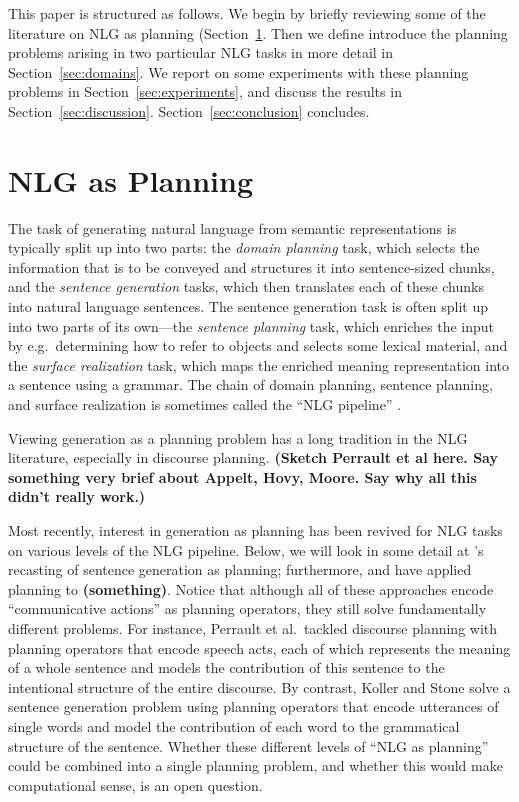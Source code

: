 \documentclass[letterpaper]{article}
\newcommand{\todo}[1]{\textbf{(#1)}}
\begin{document}
This paper is structured as follows. We begin by briefly reviewing
some of the literature on NLG as planning
(Section~\ref{sec:nlg-as-planning}. Then we define introduce the
planning problems arising in two particular NLG tasks in more detail
in Section~\ref{sec:domains}. We report on some experiments with these
planning problems in Section~\ref{sec:experiments}, and discuss the
results in Section~\ref{sec:discussion}. Section~\ref{sec:conclusion}
concludes.


\section{NLG as Planning} \label{sec:nlg-as-planning}

The task of generating natural language from semantic representations
is typically split up into two parts: the \emph{domain planning} task,
which selects the information that is to be conveyed and structures it
into sentence-sized chunks, and the \emph{sentence generation} tasks,
which then translates each of these chunks into natural language
sentences. The sentence generation task is often split up into two
parts of its own---the \emph{sentence planning} task, which enriches
the input by e.g.\ determining how to refer to objects and selects
some lexical material, and the \emph{surface realization} task, which
maps the enriched meaning representation into a sentence using a
grammar. The chain of domain planning, sentence planning, and surface
realization is sometimes called the ``NLG pipeline''
\cite{reiter00building}. 

Viewing generation as a planning problem has a long tradition in the
NLG literature, especially in discourse planning. \todo{Sketch
  Perrault et al here. Say something very brief about Appelt, Hovy,
  Moore. Say why all this didn't really work.}

Most recently, interest in generation as planning has been revived for
NLG tasks on various levels of the NLG pipeline. Below, we will look
in some detail at \cite{KolSto07}'s recasting of sentence generation
as planning; furthermore, \cite{Steedman-Petrick:07} and
\cite{benotti08b} have applied planning to \todo{something}. Notice
that although all of these approaches encode ``communicative actions''
as planning operators, they still solve fundamentally different
problems. For instance, Perrault et al.\ tackled discourse planning
with planning operators that encode speech acts, each of which
represents the meaning of a whole sentence and models the contribution
of this sentence to the intentional structure of the entire
discourse. By contrast, Koller and Stone solve a sentence generation
problem using planning operators that encode utterances of single
words and model the contribution of each word to the grammatical
structure of the sentence. Whether these different levels of ``NLG as
planning'' could be combined into a single planning problem, and
whether this would make computational sense, is an open question.
\end{document}
